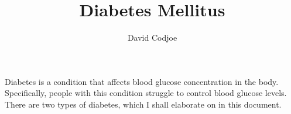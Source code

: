 \documentclass[11pt,a4paper]{memoir}
\author{David Codjoe}
\title{Diabetes Mellitus}
\begin{document}
\frontmatter
\maketitle
\newpage
Diabetes is a condition that affects blood glucose concentration in the body. Specifically, people with this condition struggle to control blood glucose levels. There are two types of diabetes, which I shall elaborate on in this document. 
\newpage
\tableofcontents
\mainmatter



	



\end{document}
